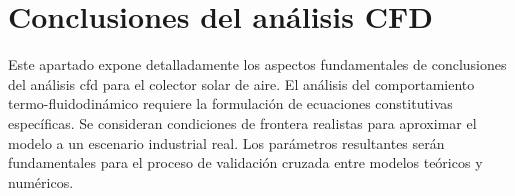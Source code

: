 \section{Conclusiones del análisis CFD}
\label{sec:cap10_conclusiones_cfd}

Este apartado expone detalladamente los aspectos fundamentales de conclusiones del análisis cfd para el colector solar de aire.
El análisis del comportamiento termo-fluidodinámico requiere la formulación de ecuaciones constitutivas específicas.
Se consideran condiciones de frontera realistas para aproximar el modelo a un escenario industrial real.
Los parámetros resultantes serán fundamentales para el proceso de validación cruzada entre modelos teóricos y numéricos.
